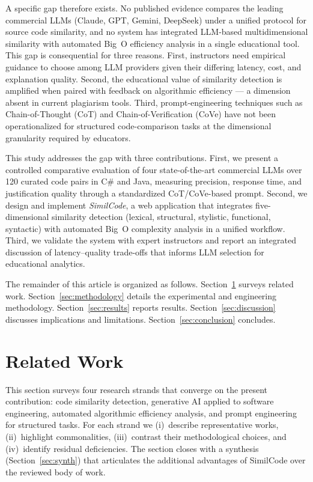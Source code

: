 \documentclass[twocolumn,11pt]{article}
\begin{document}
    A specific gap therefore exists. No published evidence compares the leading commercial LLMs (Claude, GPT, Gemini, DeepSeek) under a unified protocol for source code similarity, and no system has integrated LLM-based multidimensional similarity with automated Big~O efficiency analysis in a single educational tool. This gap is consequential for three reasons. First, instructors need empirical guidance to choose among LLM providers given their differing latency, cost, and explanation quality. Second, the educational value of similarity detection is amplified when paired with feedback on algorithmic efficiency --- a dimension absent in current plagiarism tools. Third, prompt-engineering techniques such as Chain-of-Thought (CoT) \citep{wei2022chain} and Chain-of-Verification (CoVe) \citep{dhuliawala2024chain} have not been operationalized for structured code-comparison tasks at the dimensional granularity required by educators.
     
    This study addresses the gap with three contributions. First, we present a controlled comparative evaluation of four state-of-the-art commercial LLMs over 120 curated code pairs in C\# and Java, measuring precision, response time, and justification quality through a standardized CoT/CoVe-based prompt. Second, we design and implement \emph{SimilCode}, a web application that integrates five-dimensional similarity detection (lexical, structural, stylistic, functional, syntactic) with automated Big~O complexity analysis in a unified workflow. Third, we validate the system with expert instructors and report an integrated discussion of latency--quality trade-offs that informs LLM selection for educational analytics.
     
    The remainder of this article is organized as follows. Section~\ref{sec:related} surveys related work. Section~\ref{sec:methodology} details the experimental and engineering methodology. Section~\ref{sec:results} reports results. Section~\ref{sec:discussion} discusses implications and limitations. Section~\ref{sec:conclusion} concludes.
    \section{Related Work}\label{sec:related}
    This section surveys four research strands that converge on the present contribution: code similarity detection, generative AI applied to software engineering, automated algorithmic efficiency analysis, and prompt engineering for structured tasks. For each strand we (i)~describe representative works, (ii)~highlight commonalities, (iii)~contrast their methodological choices, and (iv)~identify residual deficiencies. The section closes with a synthesis (Section~\ref{sec:synth}) that articulates the additional advantages of SimilCode over the reviewed body of work.
\end{document}
